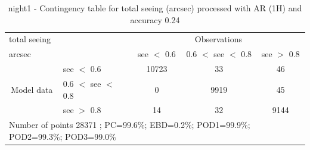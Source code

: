 \begin{table}[p!]
\begin{center}
\begin{tabular}{llccc}
\hline
{total seeing}                                       &                                                    & \multicolumn{3}{c}{Observations}                 \\
{arcsec}                                       &                             & see $<$ 0.6   & 0.6 $<$ see $<$ 0.8 & see $>$ 0.8 \\
\hline
\multicolumn{1}{c}{\multirow{3}{*}{Model data}}  & see $<$ 0.6             & 10723                & 33                       & 46              \\
                                                 & 0.6  $<$ see $<$ 0.8 & 0                & 9919                       & 45              \\
                                                 & see $>$ 0.8             & 14                & 32                       & 9144              \\
\hline
\multicolumn{5}{l}{ Number of points        28371 ; PC=99.6\%; EBD=0.2\%; POD1=99.9\%; POD2=99.3\%; POD3=99.0\%}
\end{tabular}
\end{center}
\caption{night1 - Contingency table for  total seeing (arcsec) processed with AR (1H) and accuracy 0.24}
\label{tab:contingencyseeAFT:night1}
\end{table}
